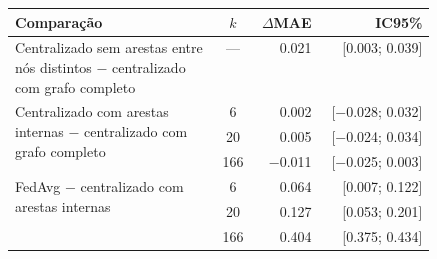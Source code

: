 \begin{tabular}{@{}p{0.49\linewidth}crr@{}}\toprule
Comparação & $k$ & $\Delta$MAE & IC95\%\\\midrule
Centralizado sem arestas entre nós distintos $-$ centralizado com grafo completo & --- & \num{0.021} & [\num{0.003}; \num{0.039}]\\
\midrule
\multirow{3}{=}{Centralizado com arestas internas $-$ centralizado com grafo completo} & 6 & \num{0.002} & [\num{-0.028}; \num{0.032}]\\
 & 20 & \num{0.005} & [\num{-0.024}; \num{0.034}]\\
 & 166 & \num{-0.011} & [\num{-0.025}; \num{0.003}]\\
\midrule
\multirow{3}{=}{FedAvg $-$ centralizado com arestas internas} & 6 & \num{0.064} & [\num{0.007}; \num{0.122}]\\
 & 20 & \num{0.127} & [\num{0.053}; \num{0.201}]\\
 & 166 & \num{0.404} & [\num{0.375}; \num{0.434}]\\
\bottomrule\end{tabular}
